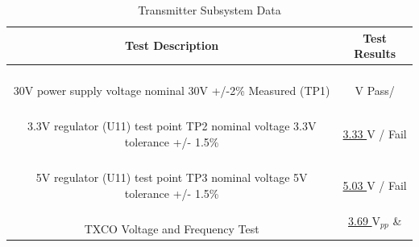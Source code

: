 \documentclass[12pt]{article}
\begin{document}
\begin{table}[h!]
\centering
\caption*{Transmitter Subsystem Data}
\begin{tabular}{ | c | c | }
\hline
\textbf{Test Description} & \textbf{Test Results} \\
\hline
\parbox{0.5\linewidth}{\raggedright \hfill \\[-0.25 em]
30V power supply voltage nominal 30V +/-2\% Measured (TP1) \hfill \\[0.1 em]
} &  \parbox{0.4\linewidth}{\raggedright \hfill \\ [0.7 em]\underline{\hspace{0.125in}
\hspace{0.05in}
\hspace{0.125in}} V
\hspace{0.125 in} Pass\space /  \hfill \\ [0.3 em]} \\
\hline
\parbox{0.5\linewidth}{\raggedright \hfill \\[-0.25 em]
3.3V regulator (U11) test point TP2 nominal voltage 3.3V  tolerance +/- 1.5\% \hfill \\[0.1 em]
} &  \parbox{0.4\linewidth}{\raggedright \hfill \\ [0.7 em]\underline{\hspace{0.125in}
3.33
\hspace{0.125in}} V 
\hspace{0.125 in} / \space  Fail \hfill \\ [0.3 em]} \\
\hline
\parbox{0.5\linewidth}{\raggedright \hfill \\[-0.25 em]
5V regulator (U11) test point TP3 nominal voltage 5V  tolerance +/- 1.5\% \hfill \\[0.1 em]
} &  \parbox{0.4\linewidth}{\raggedright \hfill \\ [0.7 em]\underline{\hspace{0.125in}
5.03
\hspace{0.125in}} V
\hspace{0.0625 in} \space / \space  Fail \hfill \\ [0.3 em]} \\ 
\hline
\parbox{0.5\linewidth}{\raggedright \hfill \\[-0.25 em]
TXCO Voltage and Frequency Test
\hfill \\[0.1 em]} &  \parbox{0.4\linewidth}{\centering \hfill \\ [0.7 em]\underline{
3.69
} V$_{pp}$ \& \underline{
}}
\end{tabular}
\end{table}
\end{document}
